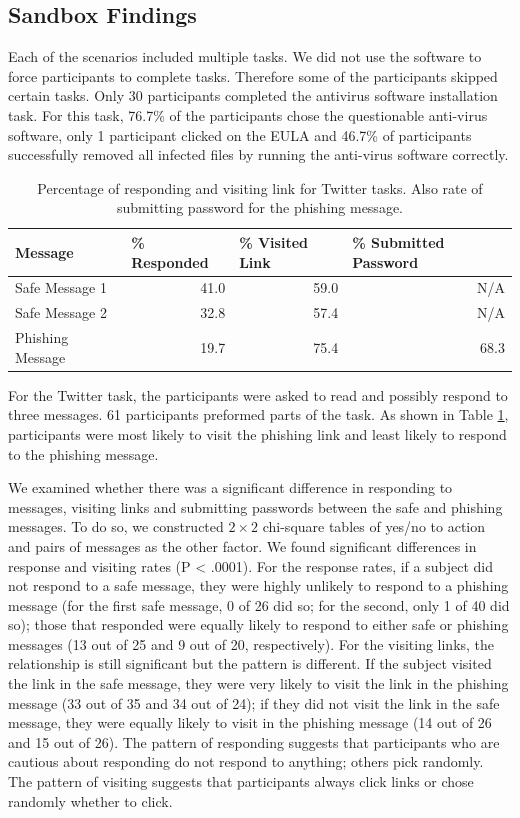 \subsection{Sandbox Findings}
Each of the scenarios included multiple tasks. We did not use the software to force participants to complete tasks. Therefore some of the participants skipped certain tasks.
Only 30 participants completed the antivirus software installation task.
For this task, 76.7\% of the participants chose the questionable anti-virus software, only 1 participant clicked on the EULA and 46.7\% of participants successfully removed all infected files by running the anti-virus software correctly.


\begin{table}[ht]
\begin{tabular}{|l|r|r|r|}
\hline
Message & \multicolumn{1}{l|}{\% Responded} & \multicolumn{1}{l|}{\% Visited Link} & \multicolumn{1}{l|}{\% Submitted Password} \\ \hline
Safe Message 1   & 41.0 & 59.0 & N/A  \\
Safe Message 2   & 32.8 & 57.4 & N/A  \\
Phishing Message & 19.7 & 75.4 & 68.3 \\ \hline
\end{tabular}
\caption{Percentage of responding and visiting link for Twitter tasks. Also rate of submitting password for the phishing message.}
\label{tab:twittertask}
\end{table}

For the Twitter task, the participants were asked to read and possibly respond to three messages. 61 participants preformed parts of the task. As shown in Table \ref{tab:twittertask}, participants were most likely to
visit the phishing link and least likely to respond to the phishing message.

We examined whether there was a significant difference in responding to messages, visiting links and submitting passwords between the safe and phishing messages. To do so, we constructed $2 \times 2$ chi-square tables of yes/no to action and pairs of messages as the other factor. We found significant differences in response and visiting rates (P < .0001). For the response rates, if a subject did not respond to a safe message, they were highly unlikely to respond to a phishing message (for the first safe message, 0 of 26 did so; for the second, only 1 of 40 did so); those that responded were equally likely to respond to either safe or phishing messages (13 out of 25 and 9 out of 20, respectively). For the visiting links, the relationship is still significant but the pattern is different. If the subject visited the link in the safe message, they were very likely to visit the link in the phishing message (33 out of 35 and 34 out of 24); if they did not visit the link in the safe message, they were equally likely to visit in the phishing message (14 out of 26 and 15 out of 26). The pattern of responding suggests that participants who are cautious about responding do not respond to anything; others pick randomly. The pattern of visiting suggests that participants always click links or chose randomly whether to click.

